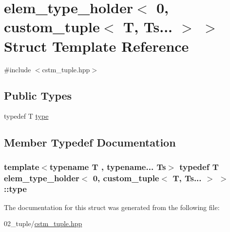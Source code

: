 \hypertarget{structelem__type__holder_3_010_00_01custom__tuple_3_01T_00_01Ts_8_8_8_01_4_01_4}{}\section{elem\+\_\+type\+\_\+holder$<$ 0, custom\+\_\+tuple$<$ T, Ts... $>$ $>$ Struct Template Reference}
\label{structelem__type__holder_3_010_00_01custom__tuple_3_01T_00_01Ts_8_8_8_01_4_01_4}


{\ttfamily \#include $<$cstm\+\_\+tuple.\+hpp$>$}

\subsection*{Public Types}
\begin{DoxyCompactItemize}
\item 
typedef T \hyperlink{structelem__type__holder_3_010_00_01custom__tuple_3_01T_00_01Ts_8_8_8_01_4_01_4_af978e6f8de071074a4c26f7450fa2636}{type}
\end{DoxyCompactItemize}


\subsection{Member Typedef Documentation}
\subsubsection[{\texorpdfstring{type}{type}}]{\setlength{\rightskip}{0pt plus 5cm}template$<$typename T , typename... Ts$>$ typedef T {\bf elem\+\_\+type\+\_\+holder}$<$ 0, {\bf custom\+\_\+tuple}$<$ T, Ts... $>$ $>$\+::{\bf type}}\hypertarget{structelem__type__holder_3_010_00_01custom__tuple_3_01T_00_01Ts_8_8_8_01_4_01_4_af978e6f8de071074a4c26f7450fa2636}{}\label{structelem__type__holder_3_010_00_01custom__tuple_3_01T_00_01Ts_8_8_8_01_4_01_4_af978e6f8de071074a4c26f7450fa2636}


The documentation for this struct was generated from the following file\+:\begin{DoxyCompactItemize}
\item 
02\+\_\+tuple/\hyperlink{cstm__tuple_8hpp}{cstm\+\_\+tuple.\+hpp}\end{DoxyCompactItemize}
